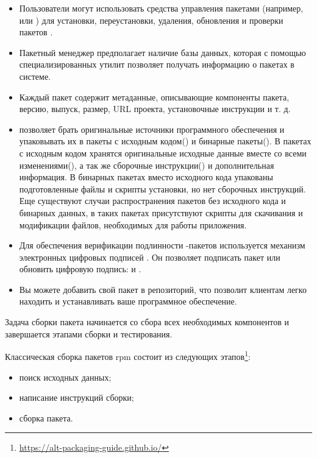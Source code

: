 \begin{itemize}
	\item Пользователи могут использовать средства управления пакетами (например,  или ) для установки, переустановки, удаления, обновления и проверки пакетов .
	\item Пакетный менеджер  предполагает наличие базы данных, которая с помощью специализированных утилит позволяет получать информацию о пакетах в системе.
	\item Каждый пакет  содержит метаданные, описывающие компоненты пакета, версию, выпуск, размер, URL проекта, установочные инструкции и т. д.
	\item {} позволяет брать оригинальные источники программного обеспечения и упаковывать их в пакеты с исходным кодом() и бинарные пакеты(). В пакетах с исходным кодом хранятся оригинальные исходные данные вместе со всеми изменениями(), а так же сборочные инструкции() и дополнительная информация. В бинарных пакетах вместо исходного кода упакованы подготовленные файлы и скрипты установки, но нет сборочных инструкций. Еще существуют случаи распространения пакетов без исходного кода и бинарных данных, в таких пакетах присутствуют скрипты для скачивания и модификации файлов, необходимых для работы приложения.
	\item Для обеспечения верификации подлинности -пакетов используется механизм электронных цифровых подписей . Он позволяет подписать  пакет или обновить цифровую подпись:  и .
	\item Вы можете добавить свой пакет в  репозиторий, что позволит клиентам легко находить и устанавливать ваше программное обеспечение.
\end{itemize}

Задача сборки пакета начинается со сбора всех необходимых компонентов и завершается этапами сборки и тестирования.

Классическая сборка пакетов rpm состоит из следующих этапов\footnote{\href{https://alt-packaging-guide.github.io/}{https://alt-packaging-guide.github.io/}}:

\begin{itemize}
	\item поиск исходных данных;
	\item написание инструкций сборки;
	\item сборка пакета.
\end{itemize}

